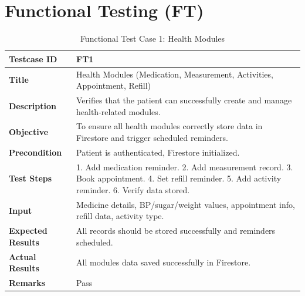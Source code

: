 \documentclass[12pt, a4paper, oneside]{report}
\begin{document}


\section{Functional Testing (FT)}

\begin{table}[H]
\centering
\caption{Functional Test Case 1: Health Modules}
\begin{tabularx}{\textwidth}{|l|X|}
\hline
\textbf{Testcase ID} & FT1 \\ \hline
\textbf{Title} & Health Modules (Medication, Measurement, Activities, Appointment, Refill) \\ \hline
\textbf{Description} & Verifies that the patient can successfully create and manage health-related modules. \\ \hline
\textbf{Objective} & To ensure all health modules correctly store data in Firestore and trigger scheduled reminders. \\ \hline
\textbf{Precondition} & Patient is authenticated, Firestore initialized. \\ \hline
\textbf{Test Steps} & 1. Add medication reminder. 2. Add measurement record. 3. Book appointment. 4. Set refill reminder. 5. Add activity reminder. 6. Verify data stored. \\ \hline
\textbf{Input} & Medicine details, BP/sugar/weight values, appointment info, refill data, activity type. \\ \hline
\textbf{Expected Results} & All records should be stored successfully and reminders scheduled. \\ \hline
\textbf{Actual Results} & All modules data saved successfully in Firestore. \\ \hline
\textbf{Remarks} & Pass \\ \hline
\end{tabularx}
\end{table}

\end{document}
